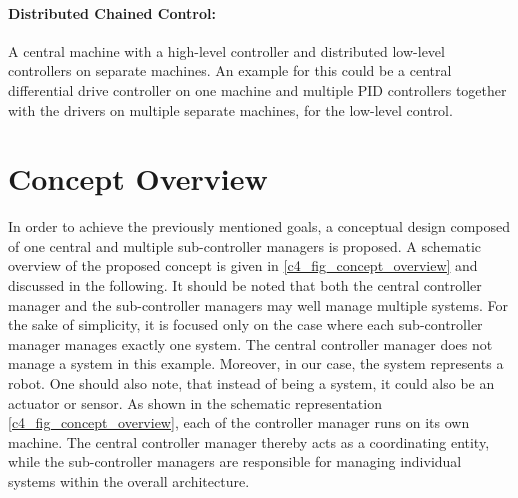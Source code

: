 \paragraph{Distributed Chained Control:}\label{c4_sec_distributed_controller_chaining}
A central machine with a high-level controller and distributed low-level controllers on separate machines. An example for this could be a central differential drive controller on one machine and multiple PID controllers together with the drivers on multiple separate machines, for the low-level control. 


\section{Concept Overview}\label{c4_sec_overview}
In order to achieve the previously mentioned goals, a conceptual design composed of one central and multiple sub-controller managers is proposed. A schematic overview of the proposed concept is given in \autoref{c4_fig_concept_overview} and discussed in the following. It should be noted that both the central controller manager and the sub-controller managers may well manage multiple systems. For the sake of simplicity, it is focused only on the case where each sub-controller manager manages exactly one system. The central controller manager does not manage a system in this example. Moreover, in our case, the system represents a robot. One should also note, that instead of being a system, it could also be an actuator or sensor.\newline
As shown in the schematic representation \autoref{c4_fig_concept_overview}, each of the controller manager runs on its own machine. The central controller manager thereby acts as a coordinating entity, while the sub-controller managers are responsible for managing individual systems within the overall architecture.\newline
